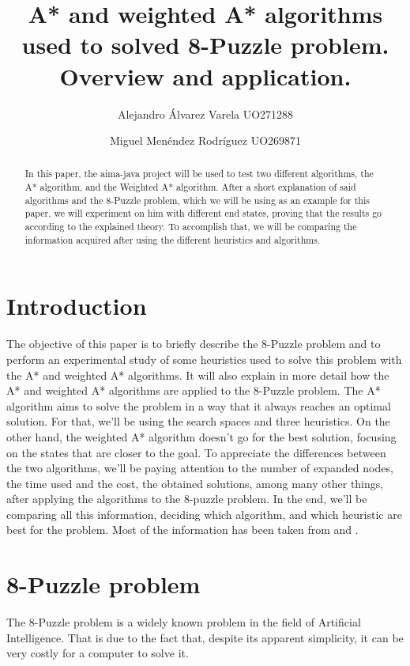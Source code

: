 \documentclass[runningheads]{llncs}
\begin{document}
\title{A* and weighted A* algorithms used to solved 8-Puzzle problem. Overview and application.}

\author{Alejandro Álvarez Varela UO271288\and
Miguel Menéndez Rodríguez UO269871}
\maketitle   
\begin{abstract}
In this paper, the aima-java project will be used to test two different algorithms, the A* algorithm, and the Weighted A* algorithm. After a short explanation of said algorithms and the 8-Puzzle problem, which we will be using as an example for this paper, we will experiment on him with different end states, proving that the results go according to the explained theory. To accomplish that, we will be comparing the information acquired after using the different heuristics and algorithms.
\end{abstract}

\section{Introduction}
The objective of this paper is to briefly describe the 8-Puzzle problem and to perform an experimental study of some heuristics used to solve this problem with the A* and weighted A* algorithms. It will also explain in more detail how the A* and weighted A* algorithms are applied to the 8-Puzzle problem.
The A* algorithm aims to solve the problem in a way that it always reaches an optimal solution. For that, we'll be using the search spaces and three heuristics.
On the other hand, the weighted A* algorithm doesn't go for the best solution, focusing on the states that are closer to the goal.
To appreciate the differences between the two algorithms, we'll be paying attention to the number of expanded nodes, the time used and the cost, the obtained solutions, among many other things, after applying the algorithms to the 8-puzzle problem.
In the end, we'll be comparing all this information, deciding which algorithm, and which heuristic are best for the problem.
Most of the information has been taken from \cite{ref_article1} and \cite{ref_article2}.

\section{8-Puzzle problem}
The 8-Puzzle problem is a widely known problem in the field of Artificial Intelligence. That is due to the fact that, despite its apparent simplicity, it can be very costly for a computer to solve it.
\end{document}
